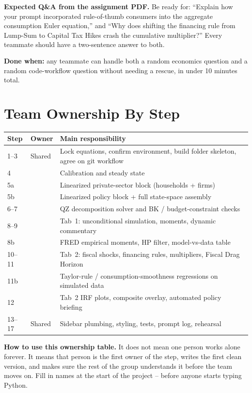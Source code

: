 \documentclass[11pt]{article}
\newcommand{\nameblank}{\underline{\hspace{4.5cm}}}
\begin{document}
\begin{notebox}
\textbf{Expected Q\&A from the assignment PDF.} Be ready for: ``Explain how your prompt incorporated rule-of-thumb consumers into the aggregate consumption Euler equation,'' and ``Why does shifting the financing rule from Lump-Sum to Capital Tax Hikes crash the cumulative multiplier?'' Every teammate should have a two-sentence answer to both.
\end{notebox}

\textbf{Done when:} any teammate can handle both a random economics question and a random code-workflow question without needing a rescue, in under 10 minutes total.

\section{Team Ownership By Step}

\begin{tabularx}{\linewidth}{@{}p{1.4cm}p{4.5cm}X@{}}
\toprule
\textbf{Step} & \textbf{Owner} & \textbf{Main responsibility} \\
\midrule
1--3 & Shared & Lock equations, confirm environment, build folder skeleton, agree on git workflow \\
4 & \nameblank & Calibration and steady state \\
5a & \nameblank & Linearized private-sector block (households + firms) \\
5b & \nameblank & Linearized policy block + full state-space assembly \\
6--7 & \nameblank & QZ decomposition solver and BK / budget-constraint checks \\
8--9 & \nameblank & Tab~1: unconditional simulation, moments, dynamic commentary \\
8b & \nameblank & FRED empirical moments, HP filter, model-vs-data table \\
10--11 & \nameblank & Tab~2: fiscal shocks, financing rules, multipliers, Fiscal Drag Horizon \\
11b & \nameblank & Taylor-rule / consumption-smoothness regressions on simulated data \\
12 & \nameblank & Tab~2 IRF plots, composite overlay, automated policy briefing \\
13--17 & Shared & Sidebar plumbing, styling, tests, prompt log, rehearsal \\
\bottomrule
\end{tabularx}

\begin{notebox}
\textbf{How to use this ownership table.} It does not mean one person works alone forever. It means that person is the first owner of the step, writes the first clean version, and makes sure the rest of the group understands it before the team moves on. Fill in names at the start of the project -- before anyone starts typing Python.
\end{notebox}
\end{document}
